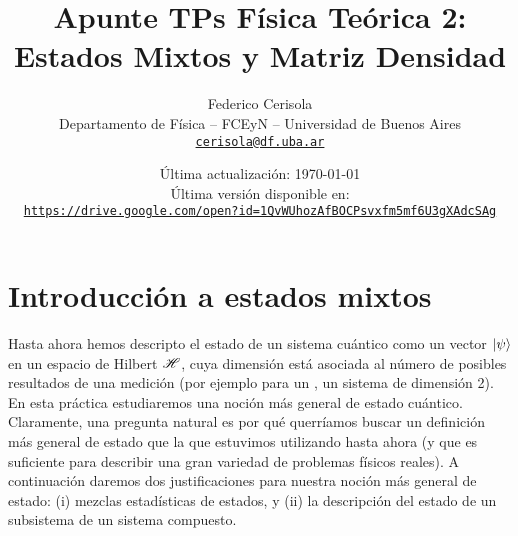 \documentclass[10pt, a4paper]{article}
\numberwithin{equation}{subsection}
\begin{document}
\title{Apunte TPs Física Teórica 2: Estados Mixtos y Matriz Densidad}
\author{Federico Cerisola
  \\ \small{Departamento de Física -- FCEyN -- Universidad de Buenos Aires}
  \\ \small{\href{mailto:cerisola@df.uba.ar}{\nolinkurl{cerisola@df.uba.ar}}}
}
\date{\small Última actualización: \today \\[1em]
  Última versión disponible en: \\
  \texttt{
    \href{https://drive.google.com/open?id=1QvWUhozAfBOCPsvxfm5mf6U3gXAdcSAg}
    {https://drive.google.com/open?id=1QvWUhozAfBOCPsvxfm5mf6U3gXAdcSAg}
  }}
\maketitle
\thispagestyle{empty}

\vfill
\doclicenseThis

\pagebreak

\newpage
  \tableofcontents
\newpage

\section{Introducción a estados mixtos}
Hasta ahora hemos descripto el estado de un sistema cuántico como un vector
$\ket{\psi}$ en un espacio de Hilbert $\mathscr{H}$, cuya dimensión está asociada
al número de posibles resultados de una medición (por ejemplo para un
\spinhalf, un sistema de dimensión 2). En esta práctica estudiaremos una noción
más general de estado cuántico. Claramente, una pregunta natural es por qué
querríamos buscar un definición más general de estado que la que estuvimos
utilizando hasta ahora (y que es suficiente para describir una gran variedad de
problemas físicos reales). A continuación daremos dos justificaciones para
nuestra noción más general de estado: (i) mezclas estadísticas de estados, y
(ii) la descripción del estado de un subsistema de un sistema compuesto.

\end{document}
